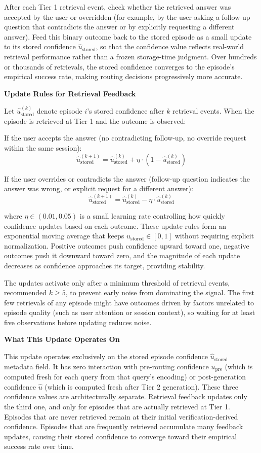 \documentclass[11pt,a4paper]{article}
\newcommand{\architecturebox}[2]{%
\begin{tcolorbox}[enhanced,breakable,
  colback=LightTeal,colframe=Teal,boxrule=1.5pt,arc=4pt,
  left=8pt,right=8pt,top=6pt,bottom=6pt,
  title={\bfseries\small\color{white}#1},
  attach boxed title to top left={yshift=-2mm,xshift=6mm},
  boxed title style={colback=Teal,arc=3pt,boxrule=0pt,
    left=4pt,right=4pt,top=2pt,bottom=2pt}]
#2
\end{tcolorbox}}
\newcommand{\uhat}{\hat{u}}
\newcommand{\upre}{u_{\text{pre}}}
\newcommand{\ustored}{\hat{u}_{\text{stored}}}
\begin{document}
\architecturebox{ARCHITECTURE UPDATE 9: Dynamic Confidence Updating via Retrieval Feedback}{
After each Tier 1 retrieval event, check whether the retrieved answer was accepted by the user or overridden (for example, by the user asking a follow-up question that contradicts the answer or by explicitly requesting a different answer). Feed this binary outcome back to the stored episode as a small update to its stored confidence $\ustored$, so that the confidence value reflects real-world retrieval performance rather than a frozen storage-time judgment. Over hundreds or thousands of retrievals, the stored confidence converges to the episode's empirical success rate, making routing decisions progressively more accurate.

\textbf{Update Rules for Retrieval Feedback}

Let $\ustored^{(k)}$ denote episode $i$'s stored confidence after $k$ retrieval events. When the episode is retrieved at Tier 1 and the outcome is observed:

If the user accepts the answer (no contradicting follow-up, no override request within the same session):
\[
\ustored^{(k+1)} = \ustored^{(k)} + \eta \cdot (1 - \ustored^{(k)})
\]

If the user overrides or contradicts the answer (follow-up question indicates the answer was wrong, or explicit request for a different answer):
\[
\ustored^{(k+1)} = \ustored^{(k)} - \eta \cdot \ustored^{(k)}
\]

where $\eta \in (0.01, 0.05)$ is a small learning rate controlling how quickly confidence updates based on each outcome. These update rules form an exponential moving average that keeps $\ustored \in [0, 1]$ without requiring explicit normalization. Positive outcomes push confidence upward toward one, negative outcomes push it downward toward zero, and the magnitude of each update decreases as confidence approaches its target, providing stability.

The updates activate only after a minimum threshold of retrieval events, recommended $k \geq 5$, to prevent early noise from dominating the signal. The first few retrievals of any episode might have outcomes driven by factors unrelated to episode quality (such as user attention or session context), so waiting for at least five observations before updating reduces noise.

\textbf{What This Update Operates On}

This update operates exclusively on the stored episode confidence $\ustored$ metadata field. It has zero interaction with pre-routing confidence $\upre$ (which is computed fresh for each query from that query's encoding) or post-generation confidence $\uhat$ (which is computed fresh after Tier 2 generation). These three confidence values are architecturally separate. Retrieval feedback updates only the third one, and only for episodes that are actually retrieved at Tier 1. Episodes that are never retrieved remain at their initial verification-derived confidence. Episodes that are frequently retrieved accumulate many feedback updates, causing their stored confidence to converge toward their empirical success rate over time.

}
\end{document}

